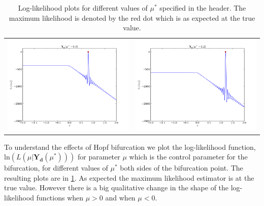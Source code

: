 \begin{table}[ht]
\begin{tabular}{cc}
\includegraphics[scale=0.3]{likelihood_hopf08}&\includegraphics[scale=0.3]{likelihood_hopf12}\\
\end{tabular}
\caption{Log-likelihood plots for different values of $\mu^*$ specified in the header. The maximum likelihood is denoted by the red dot which is as expected at the true value.}
\label{fig:hopf}
\end{table}
To understand the effects of Hopf bifurcation we plot the log-likelihood function, $\text{ln}(L(\mu | \mathbf{Y_{d}}(\mu^*)))$ for parameter $\mu$ which is the control parameter for the bifurcation, for different values of $\mu^*$ both sides of the bifurcation point. The resulting plots are in \ref{fig:hopf}. As expected the maximum likelihood estimator is at the true value. However there is a big qualitative change in the shape of the log-likelihood functions when $\mu > 0$ and when $\mu < 0$. 

